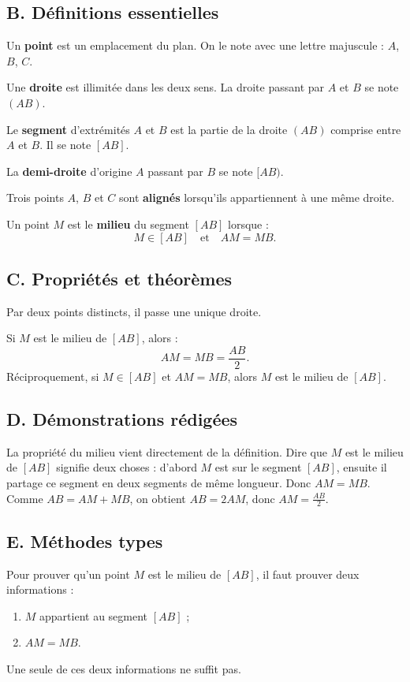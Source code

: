 \documentclass[11pt,a4paper]{article}
\newcommand{\defs}{\subsection*{B. Définitions essentielles}}
\newcommand{\props}{\subsection*{C. Propriétés et théorèmes}}
\newcommand{\demos}{\subsection*{D. Démonstrations rédigées}}
\newcommand{\methodes}{\subsection*{E. Méthodes types}}
\begin{document}
\defs
\begin{definitionbox}
Un \textbf{point} est un emplacement du plan. On le note avec une lettre majuscule : $A$, $B$, $C$.

Une \textbf{droite} est illimitée dans les deux sens. La droite passant par $A$ et $B$ se note $(AB)$.

Le \textbf{segment} d'extrémités $A$ et $B$ est la partie de la droite $(AB)$ comprise entre $A$ et $B$. Il se note $[AB]$.

La \textbf{demi-droite} d'origine $A$ passant par $B$ se note $[AB)$.
\end{definitionbox}

\begin{definitionbox}
Trois points $A$, $B$ et $C$ sont \textbf{alignés} lorsqu'ils appartiennent à une même droite.

Un point $M$ est le \textbf{milieu} du segment $[AB]$ lorsque :
\[
M \in [AB] \quad \text{et} \quad AM=MB.
\]
\end{definitionbox}

\props
\begin{proprietebox}
Par deux points distincts, il passe une unique droite.
\end{proprietebox}

\begin{proprietebox}
Si $M$ est le milieu de $[AB]$, alors :
\[
AM=MB=\frac{AB}{2}.
\]
Réciproquement, si $M\in[AB]$ et $AM=MB$, alors $M$ est le milieu de $[AB]$.
\end{proprietebox}

\demos
\begin{preuvebox}
La propriété du milieu vient directement de la définition. Dire que $M$ est le milieu de $[AB]$ signifie deux choses : d'abord $M$ est sur le segment $[AB]$, ensuite il partage ce segment en deux segments de même longueur. Donc $AM=MB$. Comme $AB=AM+MB$, on obtient $AB=2AM$, donc $AM=\frac{AB}{2}$.
\end{preuvebox}

\methodes
\begin{methodebox}
Pour prouver qu'un point $M$ est le milieu de $[AB]$, il faut prouver deux informations :
\begin{enumerate}
\item $M$ appartient au segment $[AB]$ ;
\item $AM=MB$.
\end{enumerate}
Une seule de ces deux informations ne suffit pas.
\end{methodebox}
\end{document}
